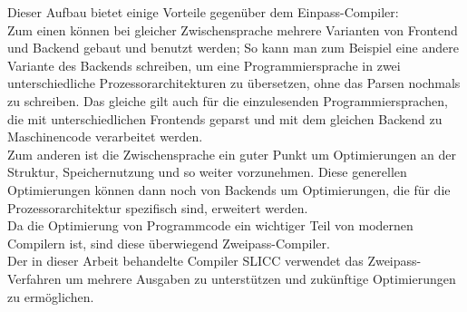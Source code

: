 Dieser Aufbau bietet einige Vorteile gegenüber dem Einpass-Compiler:\\
Zum einen können bei gleicher Zwischensprache mehrere Varianten von Frontend und Backend gebaut und benutzt werden;
So kann man zum Beispiel eine andere Variante des Backends schreiben, um eine Programmiersprache in zwei unterschiedliche Prozessorarchitekturen zu übersetzen, ohne das Parsen nochmals zu schreiben.
Das gleiche gilt auch für die einzulesenden Programmiersprachen, die mit unterschiedlichen Frontends geparst und mit dem gleichen Backend zu Maschinencode verarbeitet werden.\\
Zum anderen ist die Zwischensprache ein guter Punkt um Optimierungen an der Struktur, Speichernutzung und so weiter vorzunehmen.
Diese generellen Optimierungen können dann noch von Backends um Optimierungen, die für die Prozessorarchitektur spezifisch sind, erweitert werden.\\
Da die Optimierung von Programmcode ein wichtiger Teil von modernen Compilern ist, sind diese überwiegend Zweipass-Compiler\cite{mossenbock:2024}.\\

Der in dieser Arbeit behandelte Compiler SLICC verwendet das Zweipass-Verfahren um mehrere Ausgaben zu unterstützen und zukünftige Optimierungen zu ermöglichen.
